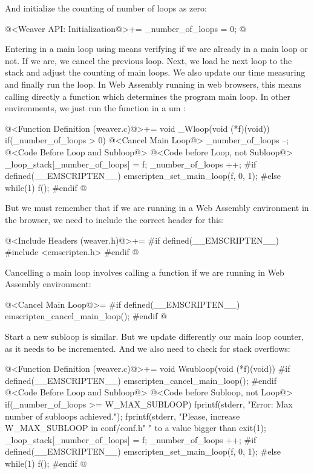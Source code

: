 And initialize the counting of number of loops as zero:

\iniciocodigo
@<Weaver API: Initialization@>+=
_number_of_loops = 0;
@
\fimcodigo

Entering in a main loop using  means verifying if we
are already in a main loop or not. If we are, we cancel the previous
loop. Next, we load he next loop to the stack and adjust the counting
of main loops. We also update our time measuring and finally run the
loop. In Web Assembly running in web browsers, this means calling
directly a function which determines the program main loop. In other
environments, we just run the function in a um :

\iniciocodigo
@<Function Definition (weaver.c)@>+=
void _Wloop(void (*f)(void)){
  if(_number_of_loops > 0){
    @<Cancel Main Loop@>
    _number_of_loops --;
  }
  @<Code Before Loop and Subloop@>
  @<Code before Loop, not Subloop@>
  _loop_stack[_number_of_loops] = f;
  _number_of_loops ++;
#if defined(__EMSCRIPTEN__)
  emscripten_set_main_loop(f, 0, 1);
#else
  while(1)
    f();
#endif
}
@
\fimcodigo

But we must remember that if we are running in a Web Assembly
environment in the browser, we need to include the correct header for
this:

\iniciocodigo
@<Include Headers (weaver.h)@>+=
#if defined(__EMSCRIPTEN__)
#include <emscripten.h>
#endif
@
\fimcodigo


Cancelling a main loop involves calling a function if we are running
in Web Assembly environment:

\iniciocodigo
@<Cancel Main Loop@>=
#if defined(__EMSCRIPTEN__)
emscripten_cancel_main_loop();
#endif
@
\fimcodigo

Start a new subloop is similar. But we update differently our main
loop counter, as it needs to be incremented. And we also need to check
for stack overflows:

\iniciocodigo
@<Function Definition (weaver.c)@>+=
void Wsubloop(void (*f)(void)){
#if defined(__EMSCRIPTEN__)
    emscripten_cancel_main_loop();
#endif
  @<Code Before Loop and Subloop@>
  @<Code before Subloop, not Loop@>
  if(_number_of_loops >= W_MAX_SUBLOOP){
    fprintf(stderr, "Error: Max number of subloops achieved.\n");
    fprintf(stderr, "Please, increase W_MAX_SUBLOOP in conf/conf.h"
            " to a value bigger than %
    exit(1);
  }
  _loop_stack[_number_of_loops] = f;
  _number_of_loops ++;
#if defined(__EMSCRIPTEN__)
  emscripten_set_main_loop(f, 0, 1);
#else
  while(1)
    f();
#endif
}
@
\fimcodigo


